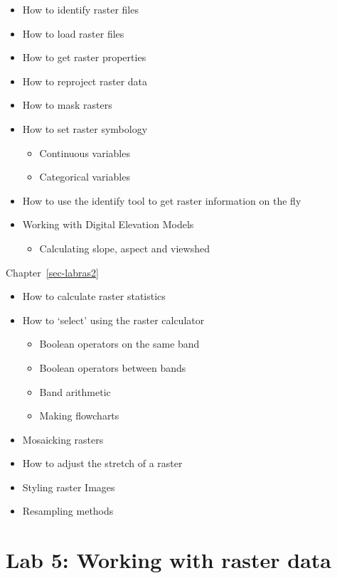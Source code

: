 \documentclass[
  letterpaper,
  DIV=11,
  numbers=noendperiod]{scrreprt}
\providecommand{\tightlist}{%
  \setlength{\itemsep}{0pt}\setlength{\parskip}{0pt}}\usepackage{longtable,booktabs,array}
\begin{document}
\begin{itemize}
\tightlist
\item
  How to identify raster files
\item
  How to load raster files
\item
  How to get raster properties
\item
  How to reproject raster data
\item
  How to mask rasters
\item
  How to set raster symbology

  \begin{itemize}
  \tightlist
  \item
    Continuous variables
  \item
    Categorical variables
  \end{itemize}
\item
  How to use the identify tool to get raster information on the fly
\item
  Working with Digital Elevation Models

  \begin{itemize}
  \tightlist
  \item
    Calculating slope, aspect and viewshed
  \end{itemize}
\end{itemize}

Chapter~\ref{sec-labras2}

\begin{itemize}
\tightlist
\item
  How to calculate raster statistics
\item
  How to `select' using the raster calculator

  \begin{itemize}
  \tightlist
  \item
    Boolean operators on the same band
  \item
    Boolean operators between bands
  \item
    Band arithmetic
  \item
    Making flowcharts
  \end{itemize}
\item
  Mosaicking rasters
\item
  How to adjust the stretch of a raster
\item
  Styling raster Images
\item
  Resampling methods
\end{itemize}

\chapter{Lab 5: Working with raster data}\label{sec-labras1}
\end{document}
